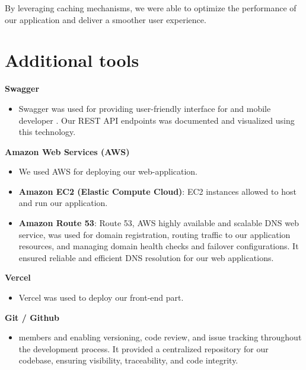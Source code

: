 By leveraging caching mechanisms, we were able to optimize the performance of our application and deliver a smoother user experience.

\section{Additional tools}\label{tools}
\textbf{Swagger \cite{swager}}

\begin{itemize}
\item Swagger \cite{swager} was used for providing user-friendly interface for  and mobile developer . Our REST API \cite{rest} endpoints was documented and visualized using this technology.
\end{itemize}

\textbf{Amazon Web Services (AWS) \cite{aws}}
\begin{itemize}
    \item  We used AWS \cite{aws} for deploying our web-application.
\end{itemize}

\begin{itemize}
\item \textbf{Amazon EC2 (Elastic Compute Cloud)}: EC2 instances allowed to host and run our application.
    
\item \textbf{Amazon Route 53}: Route 53, AWS highly available and scalable DNS web service, was used for domain registration, routing traffic to our application resources, and managing domain health checks and failover configurations. It ensured reliable and efficient DNS resolution for our web applications.
\end{itemize}

\textbf{Vercel \cite{vercel}}
\begin{itemize}
\item Vercel \cite{vercel} was used to deploy our front-end part.
\end{itemize}
\textbf{Git / Github \cite{github}}
\begin{itemize}
\item members and enabling versioning, code review, and issue tracking throughout the development process. It provided a centralized repository for our codebase, ensuring visibility, traceability, and code integrity.
\end{itemize}

